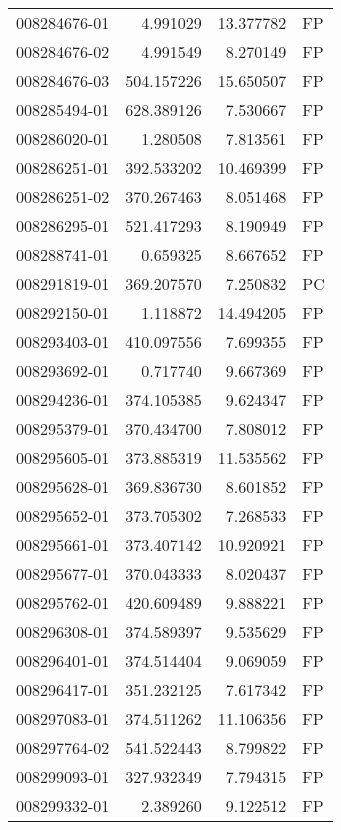 \begin{tabular}{lrrl}
008284676-01 &    4.991029 &      13.377782 &   FP \\
008284676-02 &    4.991549 &       8.270149 &   FP \\
008284676-03 &  504.157226 &      15.650507 &   FP \\
008285494-01 &  628.389126 &       7.530667 &   FP \\
008286020-01 &    1.280508 &       7.813561 &   FP \\
008286251-01 &  392.533202 &      10.469399 &   FP \\
008286251-02 &  370.267463 &       8.051468 &   FP \\
008286295-01 &  521.417293 &       8.190949 &   FP \\
008288741-01 &    0.659325 &       8.667652 &   FP \\
008291819-01 &  369.207570 &       7.250832 &   PC \\
008292150-01 &    1.118872 &      14.494205 &   FP \\
008293403-01 &  410.097556 &       7.699355 &   FP \\
008293692-01 &    0.717740 &       9.667369 &   FP \\
008294236-01 &  374.105385 &       9.624347 &   FP \\
008295379-01 &  370.434700 &       7.808012 &   FP \\
008295605-01 &  373.885319 &      11.535562 &   FP \\
008295628-01 &  369.836730 &       8.601852 &   FP \\
008295652-01 &  373.705302 &       7.268533 &   FP \\
008295661-01 &  373.407142 &      10.920921 &   FP \\
008295677-01 &  370.043333 &       8.020437 &   FP \\
008295762-01 &  420.609489 &       9.888221 &   FP \\
008296308-01 &  374.589397 &       9.535629 &   FP \\
008296401-01 &  374.514404 &       9.069059 &   FP \\
008296417-01 &  351.232125 &       7.617342 &   FP \\
008297083-01 &  374.511262 &      11.106356 &   FP \\
008297764-02 &  541.522443 &       8.799822 &   FP \\
008299093-01 &  327.932349 &       7.794315 &   FP \\
008299332-01 &    2.389260 &       9.122512 &   FP \\

\end{tabular}
